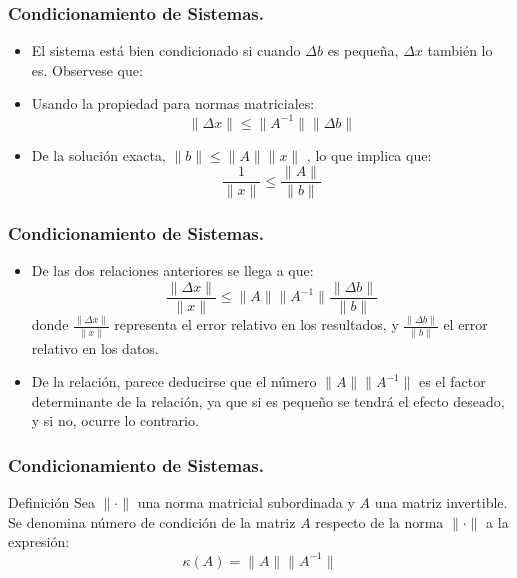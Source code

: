 \documentclass{beamer}
\begin{document}
\frame
{
  \frametitle{Condicionamiento de Sistemas.}
  \begin{itemize}
    \item El sistema est\'a bien condicionado si cuando $\Delta b$ es peque\~na, $\Delta x$ tambi\'en lo es. Observese que:
    \item<3-> Usando la propiedad para normas matriciales:
      $$
      \|\Delta x\| \leq \|A^{-1}\|\|\Delta b\|
      $$
    \item<4-> De la soluci\'on exacta, $\|b\| \leq \|A\|\|x\|$ , lo que implica que:
      $$
      \frac{1}{\|x\|}\leq\frac{\|A\|}{\|b\|}
      $$
  \end{itemize}
}
\frame
{
  \frametitle{Condicionamiento de Sistemas.}
  \begin{itemize}
    \item De las dos relaciones anteriores se llega a que:
    $$
    \frac{\|\Delta x\|}{\|x\|} \leq \|A\|\|A^{-1}\|\frac{\|\Delta b\|}{\|b\|}
    $$
    donde $\frac{\|\Delta x\|}{\|x\|}$ representa el error relativo en los resultados, y $\frac{\|\Delta b\|}{\|b\|}$ el error relativo en los datos.
    \item<2-> De la relaci\'on, parece deducirse que el n\'umero $\|A\|\|A^{-1}\|$ es el factor determinante de la relaci\'on, ya que si es peque\~no se tendr\'a el efecto deseado, y si no, ocurre lo contrario.
  \end{itemize}
}
\frame
{
  \frametitle{Condicionamiento de Sistemas.}
\begin{block}{Definici\'on}
Sea $\| \cdot \|$ una norma matricial subordinada y $A$ una matriz invertible. Se denomina n\'umero de condici\'on de la matriz $A$ respecto de la norma $\| \cdot \|$ a la expresi\'on:
$$
\kappa(A) = \|A\|\|A^{-1}\|
$$
\end{block}
}
\end{document}
